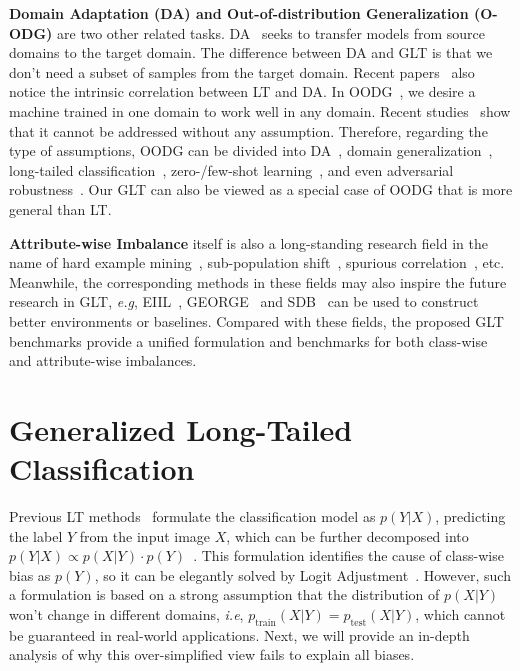 \documentclass{article}
\def\eg{\emph{e.g}} \def\Eg{\emph{E.g}}
\def\ie{\emph{i.e}} \def\Ie{\emph{I.e}}
\begin{document}
\noindent\textbf{Domain Adaptation (DA) and Out-of-distribution Generalization (O-ODG)} are two other related tasks. DA~\cite{wilson2020survey,wang2018deep,zhao2019learning,yue2021transporting} seeks to transfer models from source domains to the target domain. The difference between DA and GLT is that we don't need a subset of samples from the target domain. Recent papers~\cite{jamal2020rethinking,zou2018unsupervised} also notice the intrinsic correlation between LT and DA. In OODG~\cite{zhao21robin,arjovsky2020out,krueger2021out,arjovsky2019invariant}, we desire a machine trained in one domain to work well in any domain. Recent studies~\cite{arjovsky2020out} show that it cannot be addressed without any assumption. Therefore, regarding the type of assumptions, OODG can be divided into DA~\cite{wang2018deep}, domain generalization~\cite{li2017deeper}, long-tailed classification~\cite{zhang2021deep}, zero-/few-shot learning~\cite{sung2018learning,wang2019few,wang2019survey}, and even adversarial robustness~\cite{carlini2019evaluating,chakraborty2018adversarial}. Our GLT can also be viewed as a special case of OODG that is more general than LT.


\noindent\textbf{Attribute-wise Imbalance} itself is also a long-standing research field in the name of hard example mining~\cite{lin2017focal,nam2020learning}, sub-population shift~\cite{santurkar2020breeds,liang2022metashift,koh2021wilds}, spurious correlation~\cite{srivastava2020robustness,agarwal2020towards}, etc.  Meanwhile, the corresponding methods in these fields may also inspire the future research in GLT, \eg, EIIL~\cite{creager2021environment}, GEORGE~\cite{sohoni2020no} and SDB~\cite{idrissi2022simple} can be used to construct better environments or baselines. Compared with these fields, the proposed GLT benchmarks provide a unified formulation and benchmarks for both class-wise and attribute-wise imbalances.



%
 
\section{Generalized Long-Tailed Classification}
\label{sec:3}

Previous LT methods~\cite{ren2020balanced,menon2020long} formulate the classification model as $p(Y|X)$, predicting the label $Y$ from the input image $X$, which can be further decomposed into $p(Y|X) \propto p(X|Y)\cdot p(Y)$~\cite{menon2020long,ren2020balanced}. This formulation identifies the cause of class-wise bias as $p(Y)$, so it can be elegantly solved by Logit Adjustment~\cite{menon2020long}. However, such a formulation is based on a strong assumption that the distribution of $p(X|Y)$ won't change in different domains, \ie, $p_{\text{train}}(X|Y) = p_{\text{test}}(X|Y)$, which cannot be guaranteed in real-world applications. Next, we will provide an in-depth analysis of why this over-simplified view fails to explain all biases.
\end{document}
